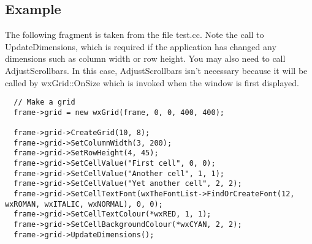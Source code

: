\subsection{Example}

The following fragment is taken from the file test.cc. Note the
call to UpdateDimensions, which is required if the application
has changed any dimensions such as column width or row height.
You may also need to call AdjustScrollbars. In this case, AdjustScrollbars
isn't necessary because it will be called by wxGrid::OnSize which is invoked
when the window is first displayed.

\begin{verbatim}
  // Make a grid
  frame->grid = new wxGrid(frame, 0, 0, 400, 400);

  frame->grid->CreateGrid(10, 8);
  frame->grid->SetColumnWidth(3, 200);
  frame->grid->SetRowHeight(4, 45);
  frame->grid->SetCellValue("First cell", 0, 0);
  frame->grid->SetCellValue("Another cell", 1, 1);
  frame->grid->SetCellValue("Yet another cell", 2, 2);
  frame->grid->SetCellTextFont(wxTheFontList->FindOrCreateFont(12, wxROMAN, wxITALIC, wxNORMAL), 0, 0);
  frame->grid->SetCellTextColour(*wxRED, 1, 1);
  frame->grid->SetCellBackgroundColour(*wxCYAN, 2, 2);
  frame->grid->UpdateDimensions();
\end{verbatim}
